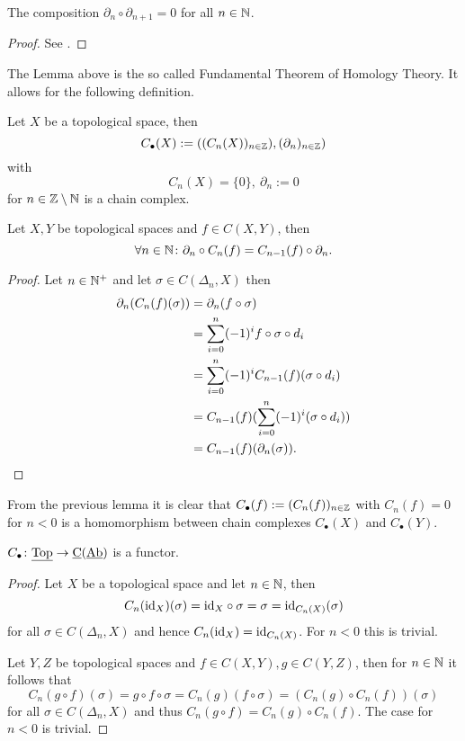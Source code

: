 \begin{lemma}
  The composition $\partial_n \circ \partial_{n+1} = 0$ for all $n \in \mathbb{N}$.
\end{lemma}

\begin{proof}
  See \cite[Lemma 8.7]{schneider2023}.
\end{proof}

The Lemma above is the so called Fundamental Theorem of Homology Theory. It allows for the following definition.

\begin{defin}
  Let $X$ be a topological space, then \[C_\bullet(X) := ((C_n(X))_{n\in \mathbb{Z}}), (\partial_n)_{n\in \mathbb{Z}})\] with
  \[C_n(X) = \{0\}, \: \partial_n := 0\] for $n \in \mathbb{Z}\setminus\mathbb{N}$ is a chain complex.
\end{defin}

\begin{lemma}
  Let $X, Y$ be topological spaces and $f \in C(X, Y)$, then \[\forall n\in \mathbb{N}\colon \partial_n \circ C_n(f) = C_{n-1}(f) \circ \partial_n.\]
\end{lemma}

\begin{proof}
  Let $n \in \mathbb{N}^+$ and let $\sigma \in C(\Delta_n, X)$ then
  \begin{align*}
    \partial_n(C_n(f)(\sigma)) &= \partial_n(f\circ\sigma) \\
    &= \sum\limits_{i=0}^n(-1)^if\circ\sigma\circ d_i \\
    &= \sum\limits_{i=0}^n(-1)^iC_{n-1}(f)(\sigma\circ d_i) \\
    &= C_{n-1}(f)(\sum\limits_{i=0}^n(-1)^i(\sigma\circ d_i)) \\
    & = C_{n-1}(f)(\partial_n(\sigma)).\qedhere
  \end{align*}
\end{proof}

From the previous lemma it is clear that $C_\bullet(f) := (C_n(f))_{n\in \mathbb{Z}}$ with $C_n(f) = 0$ for $n < 0$ is a homomorphism between chain complexes $C_\bullet(X)$ and $C_\bullet(Y)$.

\begin{lemma}\label{lem:cfunc}
  $C_\bullet\colon \underline{\rm Top} \to \underline{\rm C}(\underline{\rm Ab})$ is a functor.
\end{lemma}

\begin{proof}
  Let $X$ be a topological space and let $n \in \mathbb{N}$, then \[C_n({\rm id}_X)(\sigma) = {\rm id}_X\circ \sigma = \sigma = {\rm id}_{C_n(X)}(\sigma)\]
  for all $\sigma \in C(\Delta_n, X)$ and hence $C_n({\rm id}_X) = {\rm id}_{C_n(X)}$.
  For $n < 0$ this is trivial.

  Let $Y, Z$ be topological spaces and $f \in C(X, Y), g\in C(Y, Z)$, then for $n\in \mathbb{N}$ it follows that \[C_n(g\circ f)(\sigma) = g\circ f \circ \sigma = C_n(g)(f\circ \sigma) = (C_n(g) \circ C_n(f))(\sigma)\] for all $\sigma \in C(\Delta_n, X)$ and thus $C_n(g \circ f) = C_n(g) \circ C_n(f)$.
  The case for $n < 0$ is trivial.
\end{proof}

